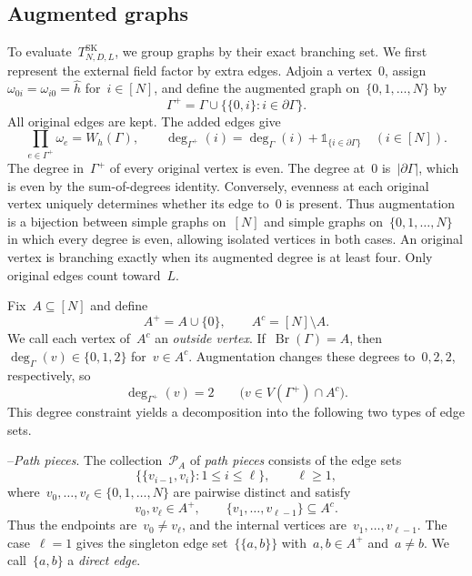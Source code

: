 \documentclass[letterpaper,11pt,reqno]{amsart}
\renewcommand{\leq}{\leqslant}
\renewcommand{\geq}{\geqslant}
\newcommand{\ind}{\mathds{1}}
\newcommand{\hh}{\hat{h}}
\DeclareMathOperator{\Br}{Br}
\begin{document}
\subsection{Augmented graphs}\label{subsec:sk-evaluation}

To evaluate~$T^{\mathrm{SK}}_{N,D,L}$, we group graphs by their exact branching set. We first represent the external field factor by extra edges. Adjoin a vertex~$0$, assign~$\omega_{0i}=\omega_{i0}=\hh$ for~$i\in[N]$, and define the augmented graph on~$\{0,1,\ldots,N\}$ by
\begin{equation*}
\Gamma^+=\Gamma\cup\bigl\{\{0,i\}:i\in\partial\Gamma\bigr\}.
\end{equation*}
All original edges are kept. The added edges give
\begin{equation*}
\prod_{e\in\Gamma^+}\omega_e=W_h(\Gamma),\qquad
\deg_{\Gamma^+}(i)=\deg_\Gamma(i)+\ind_{\{i\in\partial\Gamma\}}\quad(i\in[N]).
\end{equation*}
The degree in~$\Gamma^+$ of every original vertex is even. The degree at~$0$ is~$|\partial\Gamma|$, which is even by the sum-of-degrees identity. Conversely, evenness at each original vertex uniquely determines whether its edge to~$0$ is present. Thus augmentation is a bijection between simple graphs on~$[N]$ and simple graphs on~$\{0,1,\ldots,N\}$ in which every degree is even, allowing isolated vertices in both cases. An original vertex is branching exactly when its augmented degree is at least four. Only original edges count toward~$L$.

Fix~$A\subseteq[N]$ and define
\begin{equation*}
A^+=A\cup\{0\},\qquad A^c=[N]\setminus A.
\end{equation*}
We call each vertex of~$A^c$ an \emph{outside vertex}. If~$\Br(\Gamma)=A$, then~$\deg_\Gamma(v)\in\{0,1,2\}$ for~$v\in A^c$. Augmentation changes these degrees to~$0,2,2$, respectively, so
\begin{equation}\label{eq:sk-outside-degree}
\deg_{\Gamma^+}(v)=2\qquad\bigl(v\in V(\Gamma^+)\cap A^c\bigr).
\end{equation}
This degree constraint yields a decomposition into the following two types of edge sets.

--\emph{Path pieces}. The collection~$\mathscr P_A$ of \emph{path pieces} consists of the edge sets
\begin{equation*}
\bigl\{\{v_{i-1},v_i\}:1\leq i\leq\ell\bigr\},\qquad \ell\geq1,
\end{equation*}
where~$v_0,\ldots,v_\ell\in\{0,1,\ldots,N\}$ are pairwise distinct and satisfy
\begin{equation*}
v_0,v_\ell\in A^+,\qquad \{v_1,\ldots,v_{\ell-1}\}\subseteq A^c.
\end{equation*}
Thus the endpoints are~$v_0\ne v_\ell$, and the internal vertices are~$v_1,\ldots,v_{\ell-1}$. The case~$\ell=1$ gives the singleton edge set~$\{\{a,b\}\}$ with~$a,b\in A^+$ and~$a\ne b$. We call~$\{a,b\}$ a \emph{direct edge}.
\end{document}
